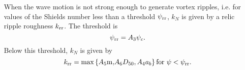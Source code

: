 When the wave motion is not strong enough to generate vortex ripples, i.e.
for values of the Shields number less than a threshold $\psi _{{\rm rr}}$,
$k_{N}$ is given by a relic ripple roughness $k_{{\rm rr}}$. The threshold is
\begin{equation}
\psi _{{\rm rr}}=A_{3}\psi _{c}.
\end{equation}
Below this threshold, $k_{N}$ is given by 
\begin{equation}
k_{{\rm rr}}=\max \left\{ A_5 {\rm m,} A_6 D_{50}, A_{4}a_{b}\right\}
{\rm for\ }\psi <\psi _{{\rm rr}}.\label{eq:SHOWEX_krr}
\end{equation}


